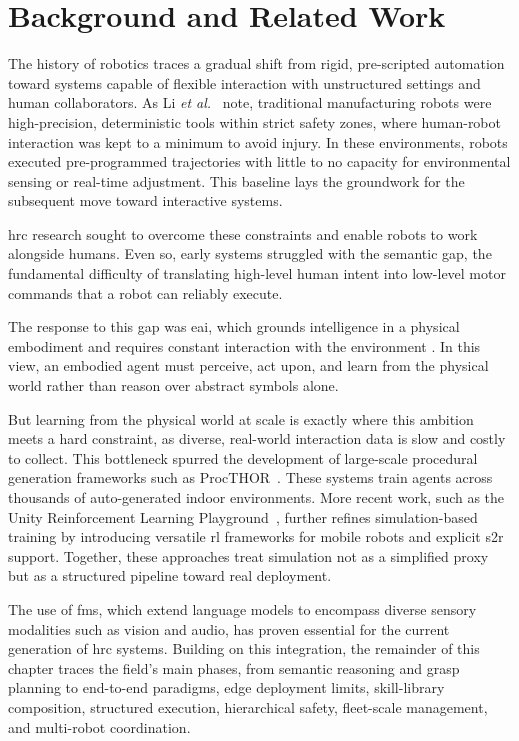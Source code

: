 \chapter{Background and Related Work}\label{background}
The history of robotics traces a gradual shift from rigid, pre-scripted automation toward systems capable of flexible interaction with unstructured settings and human collaborators. As Li \emph{et al.}~\cite{Li2020} note, traditional manufacturing robots were high-precision, deterministic tools within strict safety zones, where human-robot interaction was kept to a minimum to avoid injury. In these environments, robots executed pre-programmed trajectories with little to no capacity for environmental sensing or real-time adjustment. This baseline lays the groundwork for the subsequent move toward interactive systems.

\gls{hrc} research sought to overcome these constraints and enable robots to work alongside humans. Even so, early systems struggled with the semantic gap, the fundamental difficulty of translating high-level human intent into low-level motor commands that a robot can reliably execute.

The response to this gap was \gls{eai}, which grounds intelligence in a physical embodiment and requires constant interaction with the environment \cite{Li2026}. In this view, an embodied agent must perceive, act upon, and learn from the physical world rather than reason over abstract symbols alone.

But learning from the physical world at scale is exactly where this ambition meets a hard constraint, as diverse, real-world interaction data is slow and costly to collect. This bottleneck spurred the development of large-scale procedural generation frameworks such as ProcTHOR~\cite{deitke2022procthorlargescaleembodiedai}. These systems train agents across thousands of auto-generated indoor environments. More recent work, such as the Unity Reinforcement Learning Playground~\cite{ye2025unityrlplaygroundversatile}, further refines simulation-based training by introducing versatile \gls{rl} frameworks for mobile robots and explicit \gls{s2r} support. Together, these approaches treat simulation not as a simplified proxy but as a structured pipeline toward real deployment.

The use of \glspl{fm}, which extend language models to encompass diverse sensory modalities such as vision and audio, has proven essential for the current generation of \gls{hrc} systems. Building on this integration, the remainder of this chapter traces the field's main phases, from semantic reasoning and grasp planning to end-to-end paradigms, edge deployment limits, skill-library composition, structured execution, hierarchical safety, fleet-scale management, and multi-robot coordination.

